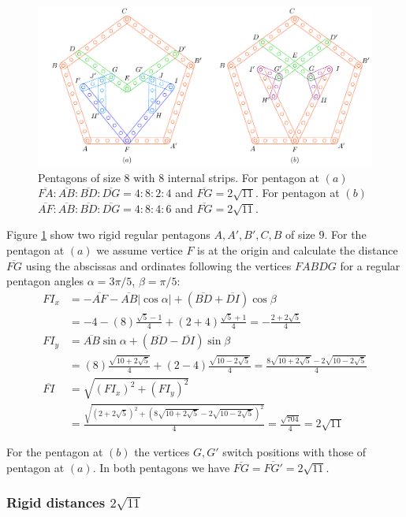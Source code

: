 \documentclass[11pt]{article}
\begin{document}
\begin{figure}[h]
\centering
\includegraphics[scale=1]{8/penta8-8a}
\caption{Pentagons of size 8 with 8 internal strips. For pentagon at $(a)$ $\overline{FA}:\overline{AB}:\overline{BD}:\overline{DG} = 4:8:2:4$ and $\overline{FG}=2\sqrt{11}$. For pentagon at $(b)$ $\overline{AF}:\overline{AB}:\overline{BD}:\overline{DG} = 4:8:4:6$ and $\overline{FG}=2\sqrt{11}$.}
\label{fig:penta8-8a}
\end{figure}

Figure \ref{fig:penta8-8a} show two rigid regular pentagons $A,A',B',C,B$ of size $9$. For the pentagon at $(a)$ we assume vertice $F$ is at the origin and calculate the distance $\overline{FG}$ using the abscissas and ordinates following the vertices $FABDG$ for a regular pentagon angles $\alpha = 3\pi/5$, $\beta=\pi/5$:
\begin{align}
FI_x &= -\overline{AF} - \overline{AB}|\cos\alpha| + (\overline{BD} + \overline{DI})\cos\beta\nonumber\\
 &= -4 -(8)\frac{\sqrt5-1}4 + (2+4)\frac{\sqrt5+1}4 = -\frac{2+2\sqrt5}4\\
FI_y &= \overline{AB}\sin\alpha + (\overline{BD}-\overline{DI})\sin\beta\nonumber\\
 &= (8)\frac{\sqrt{10+2\sqrt5}}4 + (2-4)\frac{\sqrt{10-2\sqrt5}}4
 = \frac{8\sqrt{10+2\sqrt5} - 2\sqrt{10-2\sqrt5}}4\\
\overline{FI} &= \sqrt{(FI_x)^2 + (FI_y)^2}\nonumber\\
 &= \frac{\sqrt{(2+2\sqrt5)^2 + (8\sqrt{10+2\sqrt5} - 2\sqrt{10-2\sqrt5})^2}}4
 = \frac{\sqrt{704}}4 = 2\sqrt{11}
\end{align}

For the pentagon at $(b)$ the vertices $G,G'$ switch positions with those of pentagon at $(a)$. In both pentagons we have $\overline{FG} = \overline{FG'} = 2\sqrt{11}$.


\subsubsection{Rigid distances $2\sqrt{11}$}
\end{document}
